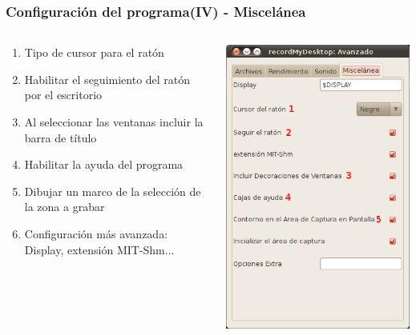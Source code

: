 \documentclass{beamer}
\begin{document}
		\begin{frame}
			\frametitle{Configuración del programa(IV) - Miscelánea}
			\begin{columns}
				\begin{column}[l]{5cm}
					\justifying
					\begin{enumerate}
						\item Tipo de cursor para el ratón
						\item Habilitar el seguimiento del ratón por el escritorio
						\item Al seleccionar las ventanas incluir la barra de título
						\item Habilitar la ayuda del programa
						\item Dibujar un marco de la selección de la zona a grabar
						\item Configuración más avanzada: Display, extensión MIT-Shm...
					\end{enumerate}
				\end{column}
				\begin{column}[r]{5cm}
					\includegraphics[height=0.8\textheight, keepaspectratio=true]{Imagenes/Interfaz/05.png}
				\end{column}
			\end{columns}
		\end{frame}
\end{document}
